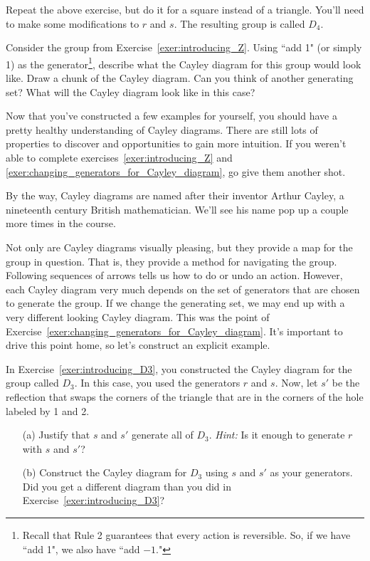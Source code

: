 \begin{exercise}\label{exer:introducing_D4}
Repeat the above exercise, but do it for a square instead of a triangle.  You'll need to make some modifications to \(r\) and \(s\).  The resulting group is called \(D_4\).
\end{exercise}

\begin{exercise}
Consider the group from Exercise~\ref{exer:introducing_Z}.  Using ``add 1" (or simply 1) as the generator\footnote{Recall that Rule 2 guarantees that every action is reversible.  So, if we have ``add 1", we also have ``add \(-1\)."}, describe what the Cayley diagram for this group would look like.  Draw a chunk of the Cayley diagram.  Can you think of another generating set?  What will the Cayley diagram look like in this case?
\end{exercise}

Now that you've constructed a few examples for yourself, you should have a pretty healthy understanding of Cayley diagrams.  There are still lots of properties to discover and opportunities to gain more intuition.  If you weren't able to complete exercises~\ref{exer:introducing_Z} and \ref{exer:changing_generators_for_Cayley_diagram}, go give them another shot.

By the way, Cayley diagrams are named after their inventor Arthur Cayley, a nineteenth century British mathematician.  We'll see his name pop up a couple more times in the course.  

Not only are Cayley diagrams visually pleasing, but they provide a map for the group in question.  That is, they provide a method for navigating the group.  Following sequences of arrows tells us how to do or undo an action.  However, each Cayley diagram very much depends on the set of generators that are chosen to generate the group.  If we change the generating set, we may end up with a very different looking Cayley diagram.  This was the point of Exercise~\ref{exer:changing_generators_for_Cayley_diagram}.  It's important to drive this point home, so let's construct an explicit example.

\begin{exercise}\label{exer:alternate_D3}
In Exercise~\ref{exer:introducing_D3}, you constructed the Cayley diagram for the group called \(D_3\).  In this case, you used the generators \(r\) and \(s\).  Now, let \(s'\) be the reflection that swaps the corners of the triangle that are in the corners of the hole labeled by 1 and 2.  
\begin{enumerate}
\item[(a)] Justify that \(s\) and \(s'\) generate all of \(D_3\).  \emph{Hint:} Is it enough to generate \(r\) with \(s\) and \(s'\)?
\item[(b)] Construct the Cayley diagram for \(D_3\) using \(s\) and \(s'\) as your generators.  Did you get a different diagram than you did in Exercise~\ref{exer:introducing_D3}?
\end{enumerate}
\end{exercise}


